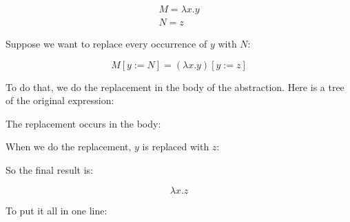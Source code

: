 \documentclass{book}
\numberwithin{equation}{chapter}
\begin{document}
\begin{align}
M = \lambda x.y \\
N = z
\end{align}

\noindent
Suppose we want to replace every occurrence of $y$ with $N$:

\begin{equation}
M[y := N] = (\lambda x.y)[y := z]
\end{equation}

\noindent
To do that, we do the replacement in the body of the abstraction. Here is a tree of the original expression:

\begin{center}
\end{center}

\noindent
The replacement occurs in the body:

\begin{center}
\end{center}

\noindent
When we do the replacement, $y$ is replaced with $z$:

\begin{center}
\end{center}

\noindent
So the final result is:

\begin{equation}
\lambda x.z 
\end{equation}

\noindent
To put it all in one line:
\end{document}
